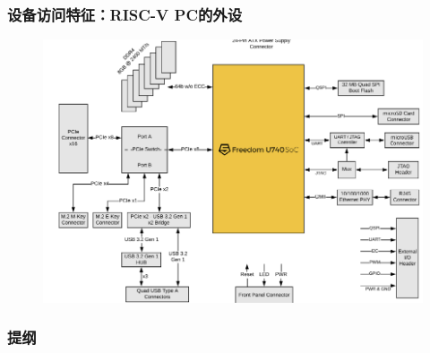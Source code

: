 \begin{frame}[fragile]
    \frametitle{设备访问特征：RISC-V PC的外设}
    \begin{figure}
        \includegraphics[width=0.65\linewidth]{figs/u740-arch.png}
    \end{figure}
\end{frame}
\begin{frame}
\frametitle{提纲} %
\tableofcontents %


\end{frame}
